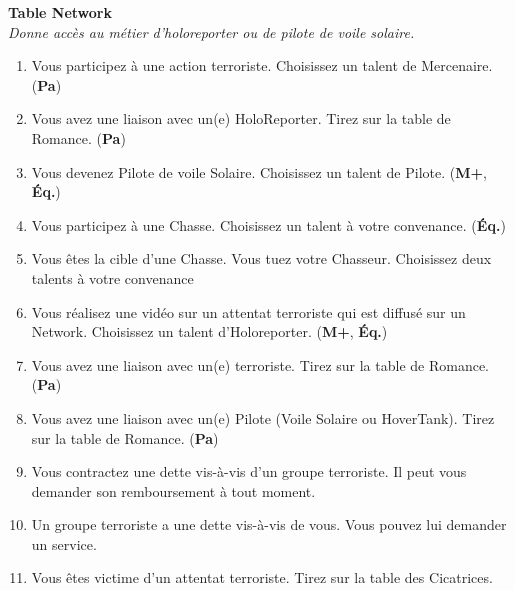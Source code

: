 \documentclass[11pt,twoside,a4paper]{article}
\begin{document}
\begin{multicols*}{2}
\textbf{Table Network  } ~\\
	\emph{\footnotesize Donne acc{\`e}s au m{\'e}tier d'holoreporter ou de pilote de voile solaire. } %
\begin{enumerate}
	\footnotesize
	\item[2] Vous participez {\`a} une action terroriste. Choisissez un talent de Mercenaire. (\textbf{Pa})
	\item[3] Vous avez une liaison avec un(e) HoloReporter. Tirez sur la table de Romance. (\textbf{Pa})
	\item[4] Vous devenez Pilote de voile Solaire. Choisissez un talent de Pilote. (\textbf{M+}, \textbf{{\'E}q.})
	\item[5] Vous participez {\`a} une Chasse. Choisissez un talent {\`a} votre convenance. (\textbf{{\'E}q.})
	\item[6] Vous {\^e}tes la cible d'une Chasse. Vous tuez votre Chasseur. Choisissez deux talents {\`a} votre convenance
	\item[7] Vous r{\'e}alisez une vid{\'e}o sur un attentat terroriste qui est diffus{\'e} sur un Network. Choisissez un talent d'Holoreporter. (\textbf{M+}, \textbf{{\'E}q.})
	\item[8] Vous avez une liaison avec un(e) terroriste. Tirez sur la table de Romance. (\textbf{Pa})
	\item[9] Vous avez une liaison avec un(e) Pilote (Voile Solaire ou HoverTank). Tirez sur la table de Romance. (\textbf{Pa})
	\item[10] Vous contractez une dette vis-{\`a}-vis d'un groupe terroriste. Il peut vous demander son remboursement {\`a} tout moment. 
	\item[11] Un groupe terroriste a une dette vis-{\`a}-vis de vous. Vous pouvez lui demander un service. 
	\item[12] Vous {\^e}tes victime d'un attentat terroriste. Tirez sur la table des Cicatrices. 
\end{enumerate}


\end{multicols*}
\end{document}
